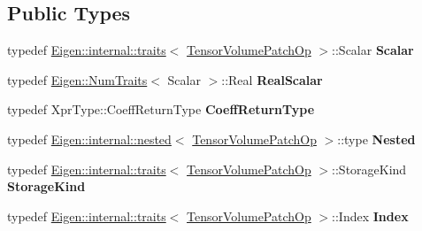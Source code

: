 \subsection*{Public Types}
\begin{DoxyCompactItemize}
\item 
\mbox{\label{class_eigen_1_1_tensor_volume_patch_op_aaa2340cc6759ec9bb4159d850bf9ea65}} 
typedef \hyperlink{struct_eigen_1_1internal_1_1traits}{Eigen\+::internal\+::traits}$<$ \hyperlink{class_eigen_1_1_tensor_volume_patch_op}{Tensor\+Volume\+Patch\+Op} $>$\+::Scalar {\bfseries Scalar}
\item 
\mbox{\label{class_eigen_1_1_tensor_volume_patch_op_a7fccefc2ec5615cca8d517e6147f65c3}} 
typedef \hyperlink{group___core___module_struct_eigen_1_1_num_traits}{Eigen\+::\+Num\+Traits}$<$ Scalar $>$\+::Real {\bfseries Real\+Scalar}
\item 
\mbox{\label{class_eigen_1_1_tensor_volume_patch_op_a135222a87283b56fb1265da275195e01}} 
typedef Xpr\+Type\+::\+Coeff\+Return\+Type {\bfseries Coeff\+Return\+Type}
\item 
\mbox{\label{class_eigen_1_1_tensor_volume_patch_op_a60a9bba01689df55835248dd01726f86}} 
typedef \hyperlink{struct_eigen_1_1internal_1_1nested}{Eigen\+::internal\+::nested}$<$ \hyperlink{class_eigen_1_1_tensor_volume_patch_op}{Tensor\+Volume\+Patch\+Op} $>$\+::type {\bfseries Nested}
\item 
\mbox{\label{class_eigen_1_1_tensor_volume_patch_op_ac8758f38bfd3291e9033a18005599fb3}} 
typedef \hyperlink{struct_eigen_1_1internal_1_1traits}{Eigen\+::internal\+::traits}$<$ \hyperlink{class_eigen_1_1_tensor_volume_patch_op}{Tensor\+Volume\+Patch\+Op} $>$\+::Storage\+Kind {\bfseries Storage\+Kind}
\item 
\mbox{\label{class_eigen_1_1_tensor_volume_patch_op_a3707bb26bc7806f3a2f43910f7a30b36}} 
typedef \hyperlink{struct_eigen_1_1internal_1_1traits}{Eigen\+::internal\+::traits}$<$ \hyperlink{class_eigen_1_1_tensor_volume_patch_op}{Tensor\+Volume\+Patch\+Op} $>$\+::Index {\bfseries Index}

\end{DoxyCompactItemize}
